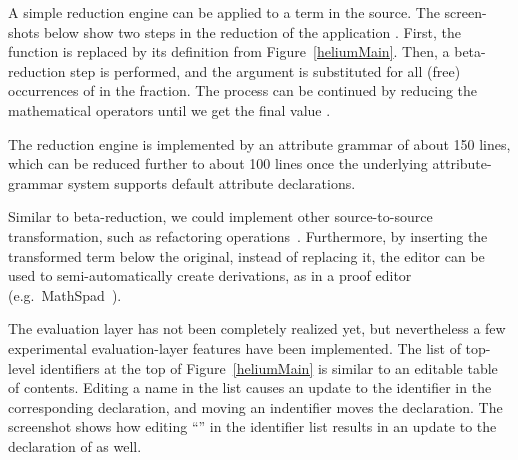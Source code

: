 

%


A simple reduction engine can be applied to a term in the source. The screen-shots below show two steps in the reduction of the application . First, the function  is replaced by its definition from Figure~\ref{heliumMain}. Then, a beta-reduction step is performed, and the argument  is substituted for all (free) occurrences of  in the fraction. The process can be continued by reducing the mathematical operators until we get the final value .

 \then
 \then


The reduction engine is implemented by an attribute grammar of about 150 lines, which can be reduced further to about 100 lines once the underlying attribute-grammar system supports default attribute declarations.

Similar to beta-reduction, we could implement other source-to-source transformation, such as refactoring operations~\cite{reinke03refactoring}. Furthermore, by inserting the transformed term below the original, instead of replacing it, the editor can be used to semi-automatically create derivations, as in a proof editor (e.g.\   MathSpad~\cite{verhoeven00mathspad}).


The evaluation layer has not been completely realized yet, but nevertheless a few experimental evaluation-layer features have been implemented. The list of top-level identifiers at the top of Figure~\ref{heliumMain} is similar to an editable table of contents. Editing a name in the list causes an update to the identifier in the corresponding declaration, and moving an indentifier moves the declaration. The screenshot shows how editing ``'' in the identifier list results in an update to the declaration of  as well.


